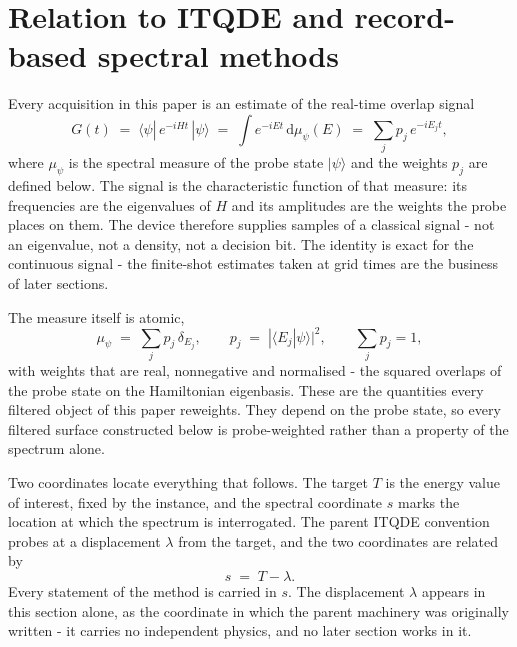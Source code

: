 \section{Relation to ITQDE and record-based spectral methods}\label{sec:N2}

Every acquisition in this paper is an estimate of the real-time overlap signal
\begin{equation}\label{def:spectral-signal}
G(t) \;=\; \langle\psi|\,e^{-iHt}\,|\psi\rangle \;=\; \int e^{-iEt}\,\mathrm{d}\mu_\psi(E) \;=\; \sum_j p_j\,e^{-iE_j t},
\end{equation}
where $\mu_\psi$ is the spectral measure of the probe state $|\psi\rangle$ and the weights $p_j$ are defined below. The signal is the characteristic function of that measure: its frequencies are the eigenvalues of $H$ and its amplitudes are the weights the probe places on them. The device therefore supplies samples of a classical signal - not an eigenvalue, not a density, not a decision bit. The identity is exact for the continuous signal - the finite-shot estimates taken at grid times are the business of later sections.

The measure itself is atomic,
\begin{equation}\label{def:spectral-weights}
\mu_\psi \;=\; \sum_j p_j\,\delta_{E_j}, \qquad p_j \;=\; |\langle E_j|\psi\rangle|^2, \qquad \sum_j p_j = 1,
\end{equation}
with weights that are real, nonnegative and normalised - the squared overlaps of the probe state on the Hamiltonian eigenbasis. These are the quantities every filtered object of this paper reweights. They depend on the probe state, so every filtered surface constructed below is probe-weighted rather than a property of the spectrum alone.

Two coordinates locate everything that follows. The target $T$ is the energy value of interest, fixed by the instance, and the spectral coordinate $s$ marks the location at which the spectrum is interrogated. The parent ITQDE convention \cite{mccaul2025snacks} probes at a displacement $\lambda$ from the target, and the two coordinates are related by
\begin{equation}\label{def:probe-target-shift}
s \;=\; T - \lambda .
\end{equation}
Every statement of the method is carried in $s$. The displacement $\lambda$ appears in this section alone, as the coordinate in which the parent machinery was originally written - it carries no independent physics, and no later section works in it.


